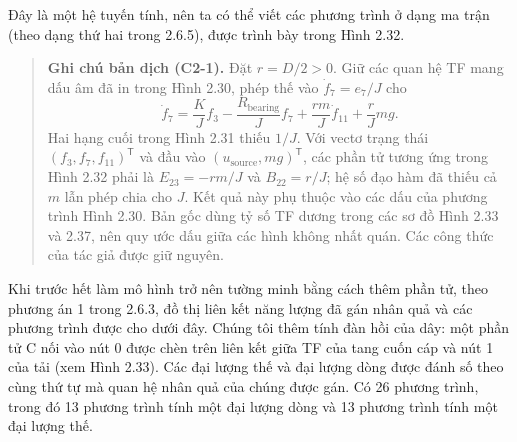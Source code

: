 Đây là một hệ tuyến tính, nên ta có thể viết các phương trình ở dạng ma trận (theo dạng thứ hai trong 2.6.5), được trình bày trong Hình 2.32.
\begin{quote}\small
\textbf{Ghi chú bản dịch (C2-1).} Đặt $r=D/2>0$. Giữ các quan hệ TF mang dấu âm đã in trong Hình 2.30, phép thế vào $\dot f_7=e_7/J$ cho
\[
\dot f_7=\frac{K}{J}f_3-\frac{R_{\mathrm{bearing}}}{J}f_7
+\frac{rm}{J}\dot f_{11}+\frac{r}{J}mg.
\]
Hai hạng cuối trong Hình 2.31 thiếu $1/J$. Với vectơ trạng thái $(f_3,f_7,f_{11})^{\mathsf{T}}$ và đầu vào $(u_{\mathrm{source}},mg)^{\mathsf{T}}$, các phần tử tương ứng trong Hình 2.32 phải là $E_{23}=-rm/J$ và $B_{22}=r/J$; hệ số đạo hàm đã thiếu cả $m$ lẫn phép chia cho $J$. Kết quả này phụ thuộc vào các dấu của phương trình Hình 2.30. Bản gốc dùng tỷ số TF dương trong các sơ đồ Hình 2.33 và 2.37, nên quy ước dấu giữa các hình không nhất quán. Các công thức của tác giả được giữ nguyên.
\end{quote}

Khi trước hết làm mô hình trở nên tường minh bằng cách thêm phần tử, theo phương án 1 trong 2.6.3, đồ thị liên kết năng lượng đã gán nhân quả và các phương trình được cho dưới đây. Chúng tôi thêm tính đàn hồi của dây: một phần tử C nối vào nút 0 được chèn trên liên kết giữa TF của tang cuốn cáp và nút 1 của tải (xem Hình 2.33). Các đại lượng thế và đại lượng dòng được đánh số theo cùng thứ tự mà quan hệ nhân quả của chúng được gán. Có 26 phương trình, trong đó 13 phương trình tính một đại lượng dòng và 13 phương trình tính một đại lượng thế.


